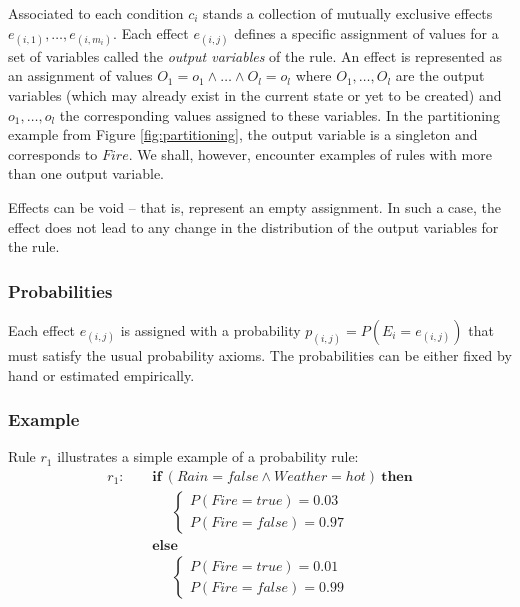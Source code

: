 Associated to each condition $c_i$ stands a collection of mutually exclusive effects $e_{(i,1)}, \dots, e_{(i,m_i)}$. Each effect $e_{(i,j)}$ defines a specific assignment of values for a set of variables called the \textit{output variables} of the rule.  An effect is represented as an assignment of values $O_1\!=\!o_1 \land \dots \land O_{l}\!=\!o_{l}$ where $O_1, \dots, O_{l}$ are the output variables (which may already exist in the current state or yet to be created) and $o_1, \dots, o_{l}$ the corresponding values assigned to these variables. In the partitioning example from Figure \ref{fig:partitioning}, the output variable is a singleton and corresponds to $Fire$. We shall, however, encounter examples of rules with more than one output variable. 

Effects can be void -- that is, represent an empty assignment.  In such a case, the effect does not lead to any change in the distribution of the output variables for the rule. 

\subsubsection*{Probabilities}

Each effect $e_{(i,j)}$ is assigned with a probability $p_{(i,j)} = P(E_i = e_{(i,j)})$ that must satisfy the usual probability axioms.  The probabilities can be either fixed by hand or estimated empirically.  %


\subsubsection*{Example}

Rule $r_1$ illustrates a simple example of a probability rule:
\begin{align*}
r_1: \ \ \ \ \ & \textbf{if} \ (\mathit{Rain}\!=\!\mathit{false} \land \mathit{Weather}\!=\!\mathit{hot}) \ \textbf{then} \\
& \;\;\;\;\;  \begin{cases}
 P(\mathit{Fire}\!=\!\mathit{true}) = 0.03 \\ 
P(\mathit{Fire}\!=\!\mathit{false}) = 0.97
\end{cases} \\ 
& \textbf{else} \\
& \;\;\;\;\; \begin{cases}
P(\mathit{Fire}\!=\!\mathit{true}) = 0.01 \\
P(\mathit{Fire}\!=\!\mathit{false}) = 0.99
\end{cases} 
\end{align*}

